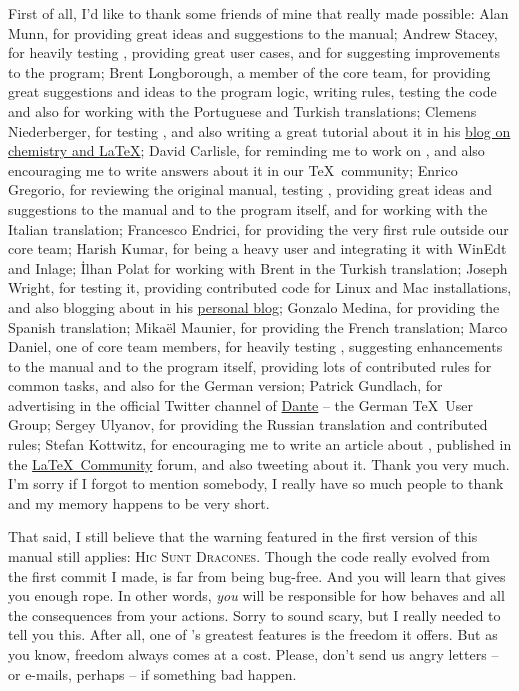 \documentclass[a4paper,twoside,12pt]{memoir}
\begin{document}
First of all, I'd like to thank some friends of mine that really made \arara possible: Alan Munn, for providing
great ideas and suggestions to the manual; Andrew Stacey, for heavily testing \arara, providing great user
cases, and for suggesting improvements to the program; Brent Longborough, a member of the core team,
for providing great suggestions and ideas to the program logic, writing rules, testing the code and also for
working with the Portuguese and Turkish translations; Clemens Niederberger, for testing \arara, and also
writing a great tutorial about it in his
\href{http://www.mychemistry.eu/2012/06/arara-automate-latex-birds-music/}{blog on chemistry and \LaTeX};
David Carlisle, for reminding me to work on \arara, and also encouraging me to write answers about it in
our \TeX\ community; Enrico Gregorio, for reviewing the original manual, testing \arara, providing great
ideas and suggestions to the manual and to the program itself, and for working with the Italian translation;
Francesco Endrici, for providing the very first \arara rule outside our core team; Harish Kumar, for being a
heavy \arara user and integrating it with WinEdt and Inlage; \.Ilhan Polat for working with Brent in the Turkish
translation; Joseph Wright, for testing it, providing contributed code for Linux and Mac installations, and also
blogging about \arara in his \href{http://www.texdev.net}{personal blog}; Gonzalo Medina, for providing the
Spanish translation; Mikaël Maunier, for providing the French translation; Marco Daniel, one of core team
members, for heavily testing \arara, suggesting enhancements to the manual and to the program itself,
providing lots of contributed rules for common tasks, and also for the German version; Patrick Gundlach,
for advertising \arara in the official Twitter channel of \href{http://www.dante.de}{Dante} -- the German
\TeX\ User Group; Sergey Ulyanov, for providing the Russian translation and contributed rules; Stefan Kottwitz,
for encouraging me to write an article about \arara, published in the
\href{http://latex-community.org/know-how/435-gnuplot-arara}{\LaTeX\ Community} forum, and also
tweeting about it. Thank you very much. I'm sorry if I forgot to mention somebody, I really have so much
people to thank and my memory happens to be very short.

That said, I still believe that the warning featured in the first version of this manual still applies:
\textsc{Hic Sunt Dracones}. Though the code really evolved from the first commit I made, \arara is far from
being bug-free. And you will learn that \arara gives you enough rope. In other words, \emph{you} will be
responsible for how \arara behaves and all the consequences from your actions. Sorry to sound scary, but I
really needed to tell you this. After all, one of \arara's greatest features is the freedom it offers. But as you
know, freedom always comes at a cost. Please, don't send us angry letters -- or e-mails, perhaps -- if
something bad happen.
\end{document}
